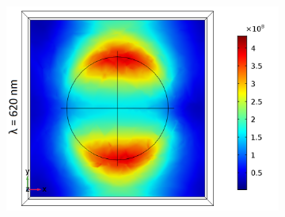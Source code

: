 \begin{figure}[htb!]
\begin{subfigure}{0.32\textwidth}
        \centering
        \includegraphics[width=\linewidth]{figures/ch4/S5A/FieldDistribution/LSPR/Sample5A_TE_Slice@z=-05t_wl=620_notitle.png}
   \end{subfigure}


\end{figure}
